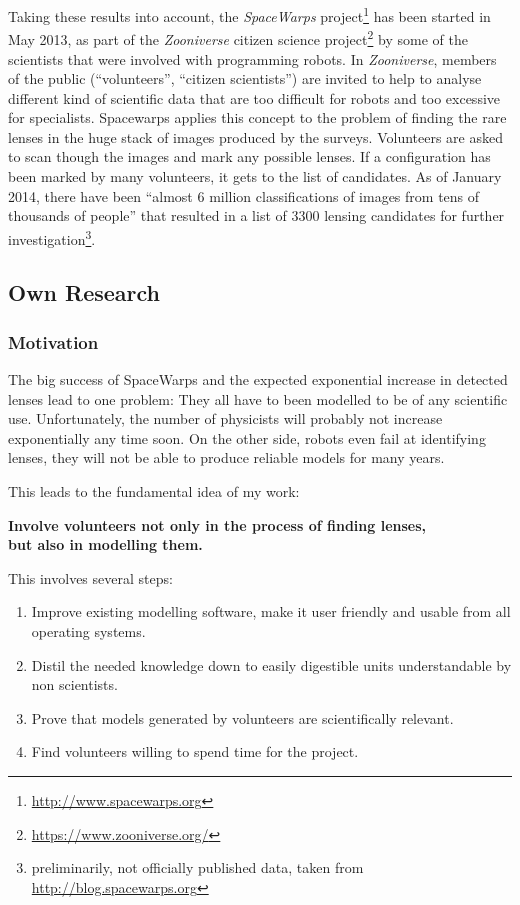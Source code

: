 \documentclass[11pt]{article}
\begin{document}
Taking these results into account, the \emph{SpaceWarps} project\footnote{\url{http://www.spacewarps.org}} has been started in May 2013, as part of the \emph{Zooniverse} citizen science project\footnote{\url{https://www.zooniverse.org/}} by some of the scientists that were involved with programming robots.
In \emph{Zooniverse}, members of the public (``volunteers'', ``citizen scientists'') are invited to help to analyse different kind of scientific data that are too difficult for robots and too excessive for specialists.
Spacewarps applies this concept to the problem of finding the rare lenses in the huge stack of images produced by the surveys.
Volunteers are asked to scan though the images and mark any possible lenses.
If a configuration has been marked by many volunteers, it gets to the list of candidates.
As of January 2014, there have been ``almost 6 million classifications of images from tens of thousands of people'' that resulted in a list of 3300 lensing candidates for further investigation\footnote{preliminarily, not officially published data, taken from \url{http://blog.spacewarps.org}}.



\subsection{Own Research}

\subsubsection{Motivation}

The big success of SpaceWarps and the expected exponential increase in detected lenses lead to one problem:
They all have to been modelled to be of any scientific use.
Unfortunately, the number of physicists will probably not increase exponentially any time soon.
On the other side, robots even fail at identifying lenses, they will not be able to produce reliable models for many years.

This leads to the fundamental idea of my work:

{\bf Involve volunteers not only in the process of finding lenses,\\but also in modelling them.}

This involves several steps:

\begin{enumerate}
  \item Improve existing modelling software, make it user friendly and usable from all operating systems.
  \item Distil the needed knowledge down to easily digestible units understandable by non scientists.
  \item Prove that models generated by volunteers are scientifically relevant.
  \item Find volunteers willing to spend time for the project.
\end{enumerate}
\end{document}
